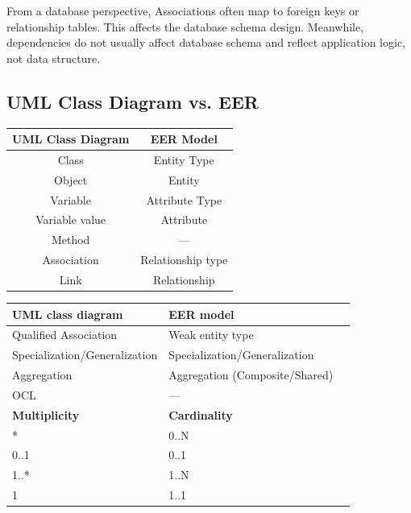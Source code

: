 \documentclass[11pt]{article}
\begin{document}
From a database perspective, Associations often map to foreign keys or relationship tables. This affects the database schema design. Meanwhile, dependencies do not usually affect database schema and reflect application logic, not data structure.

\vspace{11pt}
\subsection{UML Class Diagram vs. EER}
\vspace{11pt}

\begin{center}
    \begin{tabular}{|c|c|}
        \hline
        UML Class Diagram & EER Model \\ \hline
         Class & Entity Type \\ \hline
         Object & Entity \\ \hline
         Variable & Attribute Type \\ \hline
         Variable value & Attribute \\ \hline
         Method & --- \\ \hline
         Association & Relationship type \\ \hline
         Link & Relationship \\ \hline
    \end{tabular}
\end{center}
\vspace{11pt}


\begin{center}
    \begin{tabular}{|l|l|l|}
        \hline
        \textbf{UML class diagram} & \textbf{EER model} \\ \hline
        
        Qualified Association & Weak entity type \\ \hline
        
        Specialization/Generalization & Specialization/Generalization \\ \hline
        
        Aggregation & Aggregation (Composite/Shared) \\ \hline
        
        OCL & --- \\ \hline
        
        \multicolumn{1}{|l|}{\textbf{Multiplicity}} & \multicolumn{1}{l|}{\textbf{Cardinality}} \\ \hline
        
        *      & 0..N \\ \hline
        0..1   & 0..1 \\ \hline
        1..*   & 1..N \\ \hline
        1      & 1..1 \\ \hline
    
    \end{tabular}
\end{center}
\end{document}
